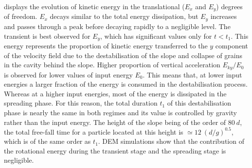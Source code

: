 \documentclass[3p,times,procedia,number]{elsarticle}
\begin{document}
 displays the evolution of kinetic energy 
in the translational ($E_x$ and $E_y$) degrees of freedom. $E_x$ decays similar 
to the total energy dissipation, but $E_y$ increases and passes through a peak 
before decaying rapidly to a negligible level. The transient is best 
observed for $E_y$, which has significant values only for $t< t_1$. This energy 
represents the proportion of kinetic energy transferred to the $y$ component of 
the velocity field  due to the destabilisation of the slope and collapse of 
grains in the cavity behind the slope. Higher proportion of vertical 
acceleration $E_{ky}/E_0$ is observed for lower values of input energy $E_0$. 
This means that, at lower input energies a larger fraction of the energy is 
consumed in the destabilisation process. Whereas at a higher input energies, 
most of the energy is dissipated in the spreading phase. For this reason, the 
total duration $t_1$ of this destabilisation phase is nearly the same in 
both regimes and its value is controlled by gravity rather than the input 
energy. The height of the slope being of the order of $80 \ d$, the total 
free-fall time for a particle located at this height is $\simeq 12 \ 
(d/g)^{0.5}$, which is of the same order as $t_1$. DEM simulations show that 
the contribution of the rotational energy during the transient stage and the 
spreading stage is negligible. 
\end{document}
